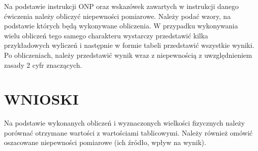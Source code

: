 \documentclass{article}
\begin{document}
{Na podstawie instrukcji ONP oraz wskazówek zawartych w instrukcji danego ćwiczenia należy
obliczyć niepewności pomiarowe. Należy podać wzory, na podstawie których będą
wykonywane obliczenia. W przypadku wykonywania wielu obliczeń tego samego charakteru
wystarczy przedstawić kilka przykładowych wyliczeń i następnie w formie tabeli przedstawić
wszystkie wyniki.
Po obliczeniach, należy przedstawić wynik wraz z niepewnością z uwzględnieniem zasady 2
cyfr znaczących.}

\section*{WNIOSKI}

{Na podstawie wykonanych obliczeń i wyznaczonych wielkości fizycznych należy porównać
otrzymane wartości z wartościami tablicowymi. Należy również omówić oszacowane
niepewności pomiarowe (ich źródło, wpływ na wynik).}
\end{document}
